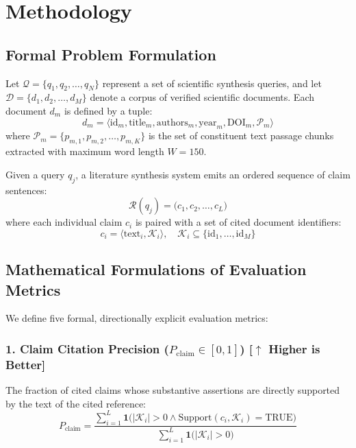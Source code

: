 \documentclass[acmsmall,screen]{acmart}
\begin{document}
\section{Methodology}

\subsection{Formal Problem Formulation}
Let $\mathcal{Q} = \{q_1, q_2, \dots, q_N\}$ represent a set of scientific synthesis queries, and let $\mathcal{D} = \{d_1, d_2, \dots, d_M\}$ denote a corpus of verified scientific documents. Each document $d_m$ is defined by a tuple:
\begin{equation}
d_m = \langle \text{id}_m, \text{title}_m, \text{authors}_m, \text{year}_m, \text{DOI}_m, \mathcal{P}_m \rangle
\end{equation}
where $\mathcal{P}_m = \{p_{m,1}, p_{m,2}, \dots, p_{m,K}\}$ is the set of constituent text passage chunks extracted with maximum word length $W = 150$.

Given a query $q_j$, a literature synthesis system emits an ordered sequence of claim sentences:
\begin{equation}
\mathcal{R}(q_j) = \big( c_1, c_2, \dots, c_{L} \big)
\end{equation}
where each individual claim $c_i$ is paired with a set of cited document identifiers:
\begin{equation}
c_i = \langle \text{text}_i, \mathcal{K}_i \rangle, \quad \mathcal{K}_i \subseteq \{\text{id}_1, \dots, \text{id}_M\}
\end{equation}

\subsection{Mathematical Formulations of Evaluation Metrics}
We define five formal, directionally explicit evaluation metrics:

\subsubsection{1. Claim Citation Precision ($P_{\text{claim}} \in [0, 1]$) [$\uparrow$ Higher is Better]}
The fraction of cited claims whose substantive assertions are directly supported by the text of the cited reference:
\begin{equation}
P_{\text{claim}} = \frac{\sum_{i=1}^{L} \mathbf{1}\big(|\mathcal{K}_i| > 0 \land \text{Support}(c_i, \mathcal{K}_i) = \text{TRUE}\big)}{\sum_{i=1}^{L} \mathbf{1}\big(|\mathcal{K}_i| > 0\big)}
\end{equation}
\end{document}
